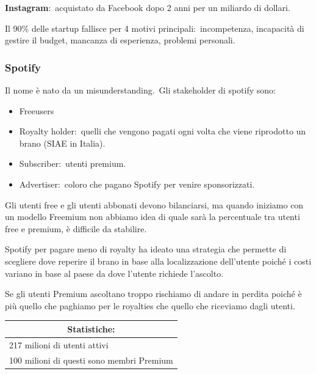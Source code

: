 \noindent \textbf{Instagram}:\ acquistato da Facebook dopo 2 anni per un miliardo di dollari.

\vspace{12pt}
\noindent Il 90\% delle startup fallisce per 4 motivi principali:\ incompetenza, incapacità di gestire il budget, mancanza di esperienza, problemi personali.

\subsubsection{Spotify}

Il nome è nato da un misunderstanding.\
Gli stakeholder di spotify sono:

\begin{itemize}
    \item Freeusers
    \item Royalty holder:\ quelli che vengono pagati ogni volta che viene riprodotto un brano (SIAE in Italia).
    \item Subscriber:\ utenti premium.
    \item Advertiser:\ coloro che pagano Spotify per venire sponsorizzati.
\end{itemize}

\noindent Gli utenti free e gli utenti abbonati devono bilanciarsi, ma quando iniziamo con un modello Freemium non abbiamo idea di quale sarà la percentuale tra utenti free e premium, è difficile da stabilire.\

Spotify per pagare meno di royalty ha ideato una strategia che permette di scegliere dove reperire il brano in base alla localizzazione dell'utente poiché i costi variano in base al paese da dove l'utente richiede l'ascolto.\

Se gli utenti Premium ascoltano troppo rischiamo di andare in perdita poiché è più quello che paghiamo per le royalties che quello che riceviamo dagli utenti.\

\begin{table}[H]
    \centering
    \begin{tabular}{|l|}
        \hline
        \multicolumn{1}{|c|}{\textbf{Statistiche:}} \\\hline\hline
        217 milioni di utenti attivi                \\
        100 milioni di questi sono membri Premium   \\\hline
    \end{tabular}
\end{table}

